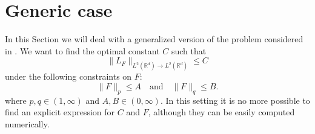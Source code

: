 \documentclass[corpo=11pt, stile=classica, tipotesi=custom,
greek, evenboxes, english]{toptesi}
\numberwithin{equation}{chapter}
\theoremstyle{remark}
\newcommand{\R}{\mathbb{R}} %
\begin{document}
\section{Generic case}
In this Section we will deal with a generalized version of the problem considered in \cite{nicolatilli_norm}. We want to find the optimal constant $C$ such that
\begin{equation*}
	\| L_F \|_{L^2(\R^d) \rightarrow L^2(\R^d)} \leq C
\end{equation*}
under the following constraints on $F$:
\begin{equation}\label{constraints generic case}
	\|F \|_p \leq A \quad \text{and} \quad \|F\|_q \leq B.
\end{equation}
where $p,q \in (1,\infty)$ and $A,B \in (0,\infty)$. In this setting it is no more possible to find an explicit expression for $C$ and $F$, {\color{red} although they can be easily computed numerically.}
\end{document}
